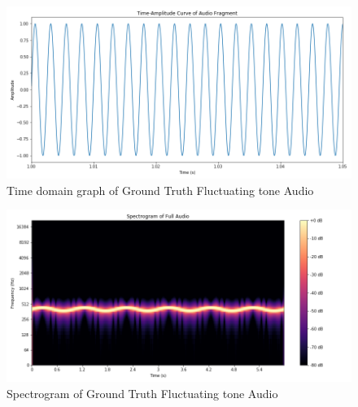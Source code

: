 \documentclass{ioereport}
\begin{document}
    \begin{figure}[H]
        \centering
        \includegraphics[width=\linewidth]{assets/audio_results/fluctuating_tone400time.png}
        \caption{Time domain graph of Ground Truth Fluctuating tone Audio}
        \label{fig:gt-fluctuating-time}
    \end{figure}
    \begin{figure}[H]
        \centering
        \includegraphics[width=\linewidth]{assets/audio_results/fluctuating_tone400spec.png}
        \caption{Spectrogram of Ground Truth Fluctuating tone Audio}
        \label{fig:gt-fluctuating-spec}
    \end{figure}
    
\end{document}
